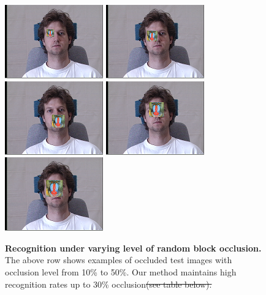 \documentclass[12pt,journal,draftcls,letterpaper,onecolumn]{IEEEtran}
\providecommand{\DIFadd}[1]{{\protect\color{blue}\uwave{#1}}} %
\providecommand{\DIFdel}[1]{{\protect\color{red}\sout{#1}}}                      %
\providecommand{\DIFaddFL}[1]{\DIFadd{#1}} %
\providecommand{\DIFdelFL}[1]{\DIFdel{#1}} %
\providecommand{\DIFaddbeginFL}{} %
\providecommand{\DIFaddendFL}{} %
\providecommand{\DIFdelbeginFL}{} %
\providecommand{\DIFdelendFL}{} %
\begin{document}
\begin{figure}[t]
\centering
\includegraphics[scale=0.75,clip=true]{figures_pami/multipie_occ/occ10.png}
\includegraphics[scale=0.75,clip=true]{figures_pami/multipie_occ/occ20.png}
\includegraphics[scale=0.75,clip=true]{figures_pami/multipie_occ/occ30.png}
\includegraphics[scale=0.75,clip=true]{figures_pami/multipie_occ/occ40.png}
\includegraphics[scale=0.75,clip=true]{figures_pami/multipie_occ/occ50.png}
\DIFaddbeginFL \vspace{-.25in}
\DIFaddendFL \caption{{\bf Recognition under varying level of
random block occlusion.} The above row shows examples of occluded test images with occlusion level from 10\% to 50\%. Our method maintains high recognition rates up to 30\% occlusion\DIFdelbeginFL \DIFdelFL{(see table below). }\DIFdelendFL \DIFaddbeginFL \DIFaddFL{:}\DIFaddendFL } 

\end{figure}
\end{document}

